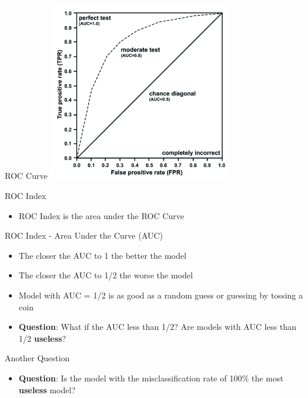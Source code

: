 \documentclass[
  ignorenonframetext,
]{beamer}
\providecommand{\tightlist}{%
  \setlength{\itemsep}{0pt}\setlength{\parskip}{0pt}}
\begin{document}
\begin{frame}{ROC Curve}
\protect\hypertarget{roc-curve-5}{}
\includegraphics[width=3.125in,height=\textheight]{images/roc4.png}
\end{frame}

\begin{frame}{ROC Index}
\protect\hypertarget{roc-index}{}
\begin{itemize}
\tightlist
\item
  ROC Index is the area under the ROC Curve
\end{itemize}
\end{frame}

\begin{frame}{ROC Index - Area Under the Curve (AUC)}
\protect\hypertarget{roc-index---area-under-the-curve-auc}{}
\begin{itemize}
\item
  The closer the AUC to 1 the better the model
\item
  The closer the AUC to 1/2 the worse the model
\item
  Model with AUC = 1/2 is as good as a random guess or guessing by
  tossing a coin
\item
  \textbf{Question}: What if the AUC less than 1/2? Are models with AUC
  less than 1/2 \textbf{useless}?
\end{itemize}
\end{frame}

\begin{frame}{Another Question}
\protect\hypertarget{another-question}{}
\begin{itemize}
\tightlist
\item
  \textbf{Question}: Is the model with the misclassification rate of
  100\% the most \textbf{useless} model?
\end{itemize}
\end{frame}
\end{document}
